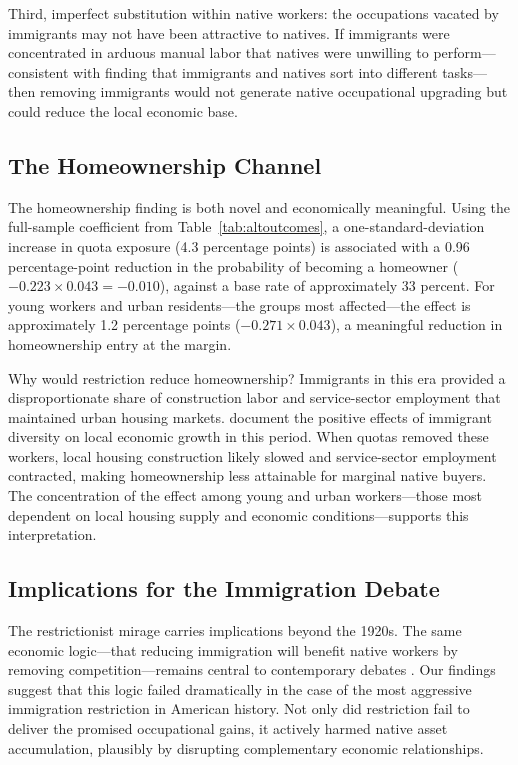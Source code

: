 \documentclass[12pt]{article}
\begin{document}
Third, imperfect substitution within native workers: the occupations vacated by immigrants may not have been attractive to natives. If immigrants were concentrated in arduous manual labor that natives were unwilling to perform---consistent with \citet{foged2016} finding that immigrants and natives sort into different tasks---then removing immigrants would not generate native occupational upgrading but could reduce the local economic base.

\subsection{The Homeownership Channel}

The homeownership finding is both novel and economically meaningful. Using the full-sample coefficient from Table~\ref{tab:altoutcomes}, a one-standard-deviation increase in quota exposure (4.3 percentage points) is associated with a 0.96 percentage-point reduction in the probability of becoming a homeowner ($-0.223 \times 0.043 = -0.010$), against a base rate of approximately 33 percent. For young workers and urban residents---the groups most affected---the effect is approximately 1.2 percentage points ($-0.271 \times 0.043$), a meaningful reduction in homeownership entry at the margin.

Why would restriction reduce homeownership? Immigrants in this era provided a disproportionate share of construction labor and service-sector employment that maintained urban housing markets. \citet{ager2013} document the positive effects of immigrant diversity on local economic growth in this period. When quotas removed these workers, local housing construction likely slowed and service-sector employment contracted, making homeownership less attainable for marginal native buyers. The concentration of the effect among young and urban workers---those most dependent on local housing supply and economic conditions---supports this interpretation.

\subsection{Implications for the Immigration Debate}

The restrictionist mirage carries implications beyond the 1920s. The same economic logic---that reducing immigration will benefit native workers by removing competition---remains central to contemporary debates \citep{borjas2003, dustmann2016}. Our findings suggest that this logic failed dramatically in the case of the most aggressive immigration restriction in American history. Not only did restriction fail to deliver the promised occupational gains, it actively harmed native asset accumulation, plausibly by disrupting complementary economic relationships.
\end{document}
